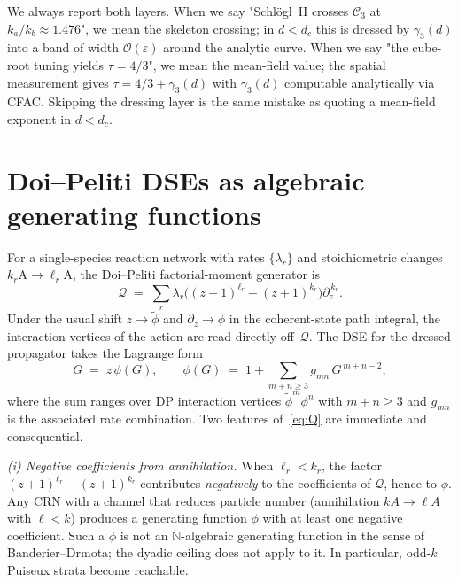\documentclass[11pt,a4paper]{article}
\newcommand{\NN}{\mathbb{N}}
\newcommand{\Ck}{\mathcal{C}}
\newcommand{\phit}{\tilde\phi}
\theoremstyle{plain}
\theoremstyle{remark}
\begin{document}
We always report both layers.  When we say "Schl\"ogl~II crosses
$\Ck_{3}$ at $k_{a}/k_{b}\approx 1.476$", we mean the skeleton
crossing; in $d<d_{c}$ this is dressed by $\gamma_{3}(d)$ into a
band of width $\mathcal{O}(\varepsilon)$ around the analytic curve.
When we say "the cube-root tuning yields $\tau=4/3$", we mean
the mean-field value; the spatial measurement gives
$\tau=4/3 + \gamma_{3}(d)$ with $\gamma_{3}(d)$ computable
analytically via CFAC.  Skipping the dressing layer is the same
mistake as quoting a mean-field exponent in $d<d_{c}$.

\section{Doi--Peliti DSEs as algebraic generating functions}
\label{sec:dp}

For a single-species reaction network with rates
$\{\lambda_{r}\}$ and stoichiometric changes
$k_{r}\mathrm{A}\to\ell_{r}\mathrm{A}$, the Doi--Peliti
factorial-moment generator is
\begin{equation}
  \mathcal{Q}
  \;=\;
  \sum_{r}\lambda_{r}\bigl((z+1)^{\ell_{r}} - (z+1)^{k_{r}}\bigr)
  \partial_{z}^{\,k_{r}}.
  \label{eq:Q}
\end{equation}
Under the usual shift $z\to\phit$ and $\partial_{z}\to\phi$ in the
coherent-state path integral, the interaction vertices of the
action are read directly off~$\mathcal{Q}$.  The DSE for the
dressed propagator takes the Lagrange form
\begin{equation}
  G \;=\; z\,\phi(G),
  \qquad
  \phi(G) \;=\; 1 + \sum_{m+n\geq 3} g_{mn}\,G^{\,m+n-2},
  \label{eq:dse}
\end{equation}
where the sum ranges over DP interaction vertices $\phit^{m}\phi^{n}$
with $m+n\geq 3$ and $g_{mn}$ is the associated rate combination.
Two features of~\eqref{eq:Q} are immediate and consequential.

\emph{(i) Negative coefficients from annihilation.}
When $\ell_{r}<k_{r}$, the factor $(z+1)^{\ell_{r}}-(z+1)^{k_{r}}$
contributes \emph{negatively} to the coefficients of $\mathcal{Q}$,
hence to $\phi$.  Any CRN with a channel that reduces particle
number (annihilation $kA\to\ell A$ with $\ell<k$) produces a
generating function $\phi$ with at least one negative coefficient.
Such a $\phi$ is not an $\NN$-algebraic generating function in
the sense of Banderier--Drmota; the dyadic ceiling does not
apply to it.  In particular, odd-$k$ Puiseux strata become
reachable.
\end{document}
